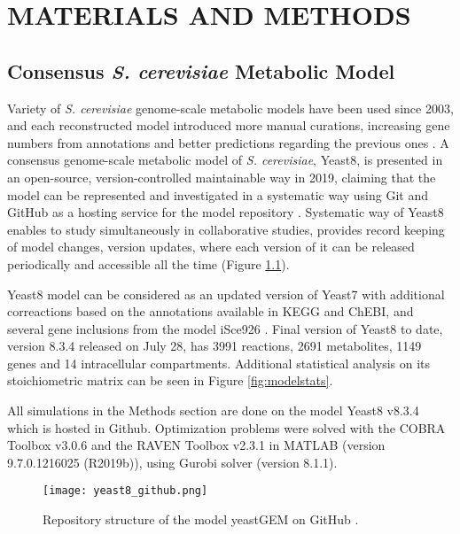 \chapter{MATERIALS AND METHODS}

\section{Consensus \emph{S. cerevisiae} Metabolic Model}
Variety of \emph{S. cerevisiae} genome-scale metabolic models have been used since 2003, and each reconstructed model introduced more manual curations, increasing gene numbers from annotations and better predictions regarding the previous ones \cite{lopes2017genome}. A consensus genome-scale metabolic model of \emph{S. cerevisiae}, Yeast8, is presented in an open-source, version-controlled maintainable way in 2019, claiming that the model can be represented and investigated in a systematic way using Git and GitHub as a hosting service for the model repository \cite{lu2019consensus}. Systematic way of Yeast8 enables to study simultaneously in collaborative studies, provides record keeping of model changes, version updates, where each version of it can be released periodically and accessible all the time (Figure \ref{fig:yeast8_github}).

Yeast8 model can be considered as an updated version of Yeast7 \cite{aung2013revising} with additional correactions based on the annotations available in KEGG and ChEBI, and several gene inclusions from the model iSce926 \cite{chowdhury2015using}. Final version of Yeast8 to date, version 8.3.4 released on July 28, has 3991 reactions, 2691 metabolites, 1149 genes and 14 intracellular compartments. Additional statistical analysis on its stoichiometric matrix can be seen in Figure \ref{fig:modelstats}.

All simulations in the Methods section are done on the model Yeast8 v8.3.4 which is hosted in Github. Optimization problems were solved with the COBRA Toolbox v3.0.6 and the RAVEN Toolbox v2.3.1 in MATLAB (version 9.7.0.1216025 (R2019b)), using Gurobi solver (version 8.1.1).

\begin{figure}[H]
\begin{center}
\texttt{[image: yeast8\_github.png]}
\end{center}
\caption[Repository structure of the model yeastGEM on GitHub \cite{lu2019consensus}]{Repository structure of the model yeastGEM on GitHub \cite{lu2019consensus}.}
\label{fig:yeast8_github}
\end{figure}

